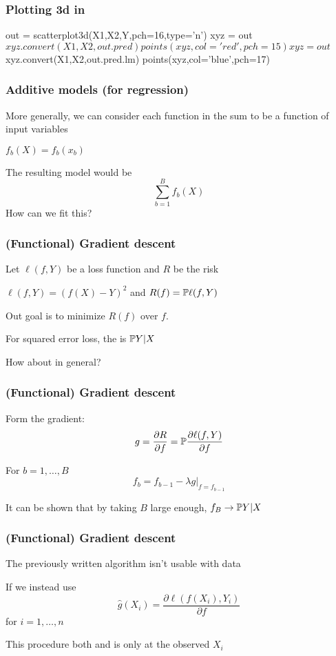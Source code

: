 \documentclass[12pt]{beamer}
\begin{document}
\begin{frame}[fragile]
\frametitle{ Plotting 3d in }
\begin{blockcode}
out = scatterplot3d(X1,X2,Y,pch=16,type='n')
xyz = out$xyz.convert(X1,X2,out.pred)
points(xyz,col='red',pch=15)
xyz = out$xyz.convert(X1,X2,out.pred.lm)
points(xyz,col='blue',pch=17)
\end{blockcode}
\end{frame}



\begin{frame}[fragile]
\frametitle{Additive models (for regression)}
More generally, we can consider each function in the sum to be a function of  input variables

\vsp
{}  $f_b(X) = f_b(x_b)$


\vsp
The resulting model would be
\[
\sum_{b=1}^B f_b(X)
\]
How can we fit this?
\end{frame}


\begin{frame}[fragile]
\frametitle{(Functional) Gradient descent}
Let $\ell(f,Y)$ be a loss function and $R$ be the risk

\vsp
{} $\ell(f,Y) = (f(X) - Y)^2$ and $R(f) = \P \ell(f,Y)$

\vsp
Out goal is to minimize $R(f)$ over $f$.  

\vsp
{} For squared error loss, the  is $\P Y|X$

\vsp
How about in general?
\end{frame}

\begin{frame}[fragile]
\frametitle{(Functional) Gradient descent}
Form the gradient:
\[
g = \frac{\partial R}{\partial f}  = \P \frac{\partial \ell(f,Y)}{\partial f}
\]
\vsp

For $b = 1,\ldots,B$
\[
f_b = f_{b-1} - \lambda g\bigg|_{f = f_{b-1}}
\]

\vsp
It can be shown that by taking $B$ large enough, $f_B \rightarrow \P Y | X$
\end{frame}

\begin{frame}[fragile]
\frametitle{(Functional) Gradient descent}
The previously written algorithm isn't usable with data 


\vsp
If we instead use
\[
\hat{g}(X_i) = \frac{\partial \ell(f(X_i),Y_i)}{\partial f}
\]
for $i = 1,\ldots, n$
\vsp

This procedure both  and is only  at the observed $X_i$
%

\end{frame}
\end{document}
